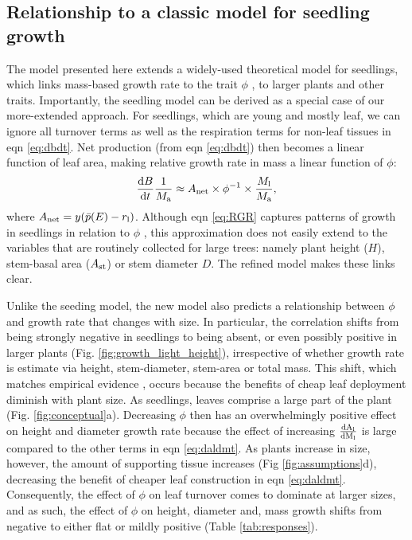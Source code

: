 \documentclass[a4paper,11pt]{article}
\begin{document}
\subsection{Relationship to a classic model for seedling growth}

The model presented here extends a widely-used theoretical model for seedlings, which links mass-based growth rate to the trait $\phi$ \citep{Lambers-1992, Wright-2000}, to larger plants and other traits. Importantly, the seedling model can be derived as a special case of our more-extended approach. For seedlings, which are young and mostly leaf, we can ignore all turnover terms as well as the respiration terms for non-leaf tissues in eqn \ref{eq:dbdt}. Net production (from eqn \ref{eq:dbdt}) then becomes a linear function of leaf area, making relative growth rate in mass a linear function of $\phi$:
\begin{equation}\label{eq:RGR}
\frac{{\rm d}B}{{\rm d}t}\frac{1}{M_{\rm a}}  \approx A_\textrm{net} \times \phi^{-1} \times \frac{M_{\rm l}}{M_{\rm a}}, \end{equation}
where $A_\textrm{net} = y(\bar{p}(E) - r_{\rm l})$. Although eqn \ref{eq:RGR} captures patterns of growth in seedlings in relation to $\phi$ \citep{Wright-2000}, this approximation does not easily extend to the variables that are routinely collected for large trees: namely plant height ($H$), stem-basal area ($A_{\rm st}$) or stem diameter $D$. The refined model makes these links clear.

Unlike the seeding model, the new model also predicts a relationship between $\phi$ and growth rate that changes with size. In particular, the correlation shifts from being strongly negative in seedlings to being absent, or even possibly positive in larger plants (Fig. \ref{fig:growth_light_height}), irrespective of whether growth rate is estimate via height, stem-diameter, stem-area or total mass. This shift, which matches empirical evidence \citep{Poorter-2008, Wright-2010, Herault-2011, Paine-2015, Gibert-2016}, occurs because the benefits of cheap leaf deployment diminish with plant size. As seedlings, leaves comprise a large part of the plant (Fig. \ref{fig:conceptual}a). Decreasing $\phi$ then has an overwhelmingly positive effect on height and diameter growth rate because the effect of increasing $\frac{\rm{d} A_{\rm l}}{\rm{d} M_{\rm l}}$ is large compared to the other terms in eqn \ref{eq:daldmt}. As plants increase in size, however, the amount of supporting tissue increases (Fig \ref{fig:assumptions}d), decreasing the benefit of cheaper leaf construction in eqn \ref{eq:daldmt}. Consequently, the effect of $\phi$ on leaf turnover comes to dominate at larger sizes, and as such, the effect of $\phi$ on height, diameter and, mass growth shifts from negative to either flat or mildly positive  (Table \ref{tab:responses}).
\end{document}
